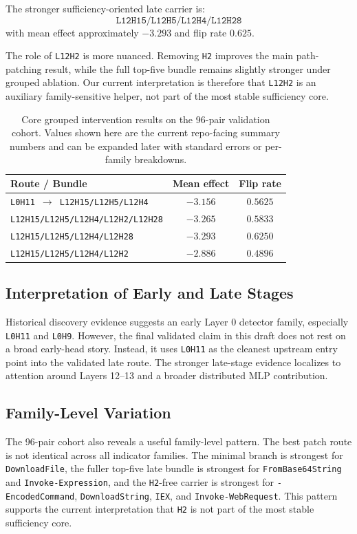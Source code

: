 \documentclass{article}
\begin{document}
The stronger sufficiency-oriented late carrier is:
\[
\texttt{L12H15/L12H5/L12H4/L12H28}
\]
with mean effect approximately \(-3.293\) and flip rate \(0.625\).

The role of \texttt{L12H2} is more nuanced. Removing \texttt{H2} improves the main path-patching result, while the full top-five bundle remains slightly stronger under grouped ablation. Our current interpretation is therefore that \texttt{L12H2} is an auxiliary family-sensitive helper, not part of the most stable sufficiency core.

\begin{table}[t]
\centering
\caption{Core grouped intervention results on the 96-pair validation cohort. Values shown here are the current repo-facing summary numbers and can be expanded later with standard errors or per-family breakdowns.}
\label{tab:main-results}
\begin{tabular}{lcc}
\toprule
Route / Bundle & Mean effect & Flip rate \\
\midrule
\texttt{L0H11 $\rightarrow$ L12H15/L12H5/L12H4} & $-3.156$ & $0.5625$ \\
\texttt{L12H15/L12H5/L12H4/L12H2/L12H28} & $-3.265$ & $0.5833$ \\
\texttt{L12H15/L12H5/L12H4/L12H28} & $-3.293$ & $0.6250$ \\
\texttt{L12H15/L12H5/L12H4/L12H2} & $-2.886$ & $0.4896$ \\
\bottomrule
\end{tabular}
\end{table}

\subsection{Interpretation of Early and Late Stages}
Historical discovery evidence suggests an early Layer 0 detector family, especially \texttt{L0H11} and \texttt{L0H9}. However, the final validated claim in this draft does not rest on a broad early-head story. Instead, it uses \texttt{L0H11} as the cleanest upstream entry point into the validated late route. The stronger late-stage evidence localizes to attention around Layers 12--13 and a broader distributed MLP contribution.

\subsection{Family-Level Variation}
The 96-pair cohort also reveals a useful family-level pattern. The best patch route is not identical across all indicator families. The minimal branch is strongest for \texttt{DownloadFile}, the fuller top-five late bundle is strongest for \texttt{FromBase64String} and \texttt{Invoke-Expression}, and the \texttt{H2}-free carrier is strongest for \texttt{-EncodedCommand}, \texttt{DownloadString}, \texttt{IEX}, and \texttt{Invoke-WebRequest}. This pattern supports the current interpretation that \texttt{H2} is not part of the most stable sufficiency core.
\end{document}
